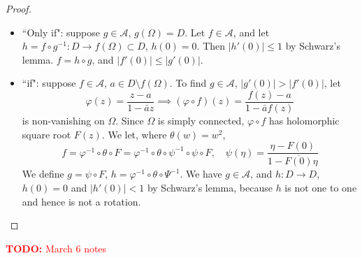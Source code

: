 \documentclass{article}
\newcommand{\mc}[1]{\mathcal{#1}}
\newcommand{\TODO}[1]{\begin{center}\huge{\textcolor{red}{\textbf{TODO:} #1}}\end{center}}
\begin{document}
\begin{proof}
\begin{itemize}

  \item ``Only if": suppose \(g \in \mc{A}\), \(g(\Omega) = D\). Let \(f \in \mc{A}\), and let \(h = f \circ g^{-1}: D \to f(\Omega) \subset D\), \(h(0) = 0\). Then \(|h'(0)| \leq 1\) by Schwarz's lemma. \(f = h \circ g\), and \(|f'(0)| \leq |g'(0)|\).

  \item ``if": suppose \(f \in \mc{A}\), \(a \in D \setminus f(\Omega)\). To find \(g \in \mc{A}\), \(|g'(0)| > |f'(0)|\), let
  \[\varphi(z) = \frac{z - a}{1 - \bar{a}z} \implies (\varphi \circ f)(z) = \frac{f(z) - a}{1 - \bar{a}f(z)}\]
  is non-vanishing on \(\Omega\). Since \(\Omega\) is simply connected, \(\varphi \circ f\) has holomorphic square root \(F(z)\). We let, where \(\theta(w) = w^2\),
  \[f = \varphi^{-1} \circ \theta \circ F = \varphi^{-1} \circ \theta \circ \psi^{-1} \circ \psi \circ F, \quad \psi(\eta) = \frac{\eta - F(0)}{1 - \overline{F(0)}\eta}\]
  We define \(g = \psi \circ F\), \(h = \varphi^{-1} \circ \theta \circ \Psi^{-1}\). We have \(g \in \mc{A}\), and \(h: D \to D\), \(h(0) = 0\) and \(|h'(0)| < 1\) by Schwarz's lemma, because \(h\) is not one to one and hence is not a rotation.

\end{itemize}
\end{proof}

\TODO{March 6 notes}
\end{document}
